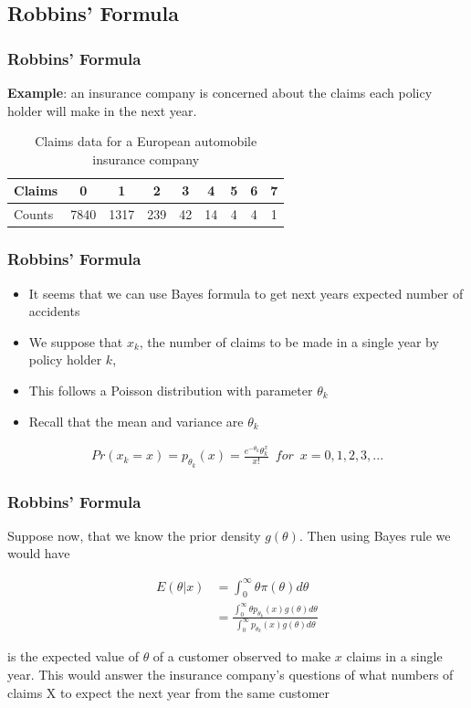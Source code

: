 \documentclass[
  shownotes,
  xcolor={svgnames},
  hyperref={colorlinks,citecolor=DarkBlue,linkcolor=DarkRed,urlcolor=DarkBlue}
  , aspectratio=169]{beamer}
\begin{document}
\subsection{Robbins' Formula}
\begin{frame}[fragile]
\frametitle{Robbins' Formula}
{\bf Example}: an insurance company is concerned about the claims each policy holder will make in the next year.
\begin{table}[H]
\caption{Claims data for a European automobile insurance company}
\begin{tabular}{lcccccccc}
Claims & 0    & 1    & 2   & 3  & 4  & 5 & 6 & 7 \\
\hline
Counts & 7840 & 1317 & 239 & 42 & 14 & 4 & 4 & 1 \\
\end{tabular}
\end{table}

\end{frame}
\begin{frame}[fragile]
\frametitle{Robbins' Formula}

\begin{itemize}
\item It seems that we can use Bayes formula to get next years expected number of accidents
\item We suppose that $x_k$, the number of claims to be made in a single year by policy holder $k$, 
\item This follows a Poisson distribution with parameter $\theta_k$
\item Recall that the mean and variance are $\theta_k$
\end{itemize}

\begin{align}
Pr(x_k=x) = p_{\theta_k}(x)= \frac{e^{-\theta_k} \theta_k^x}{x!} \,\,\, for \,\,\, x=0,1,2,3,...
\end{align}


\end{frame}
\begin{frame}[fragile]
\frametitle{Robbins' Formula}

Suppose now, that we know the prior density $g(\theta)$. Then using Bayes rule we would have

\begin{align}
E(\theta|x)&= \int_0^{\infty} \theta \pi(\theta)d\theta \\
 &=\frac{\int_0^{\infty} \theta p_{\theta_k}(x) g(\theta) d\theta }{\int_0^{\infty} p_{\theta_k}(x) g(\theta) d\theta}
\end{align}

is the expected value of $\theta$ of a customer observed to make $x$ claims in a single year. This would answer the insurance company's questions of what numbers of claims X to expect the next year from the same customer

\end{frame}
\end{document}
